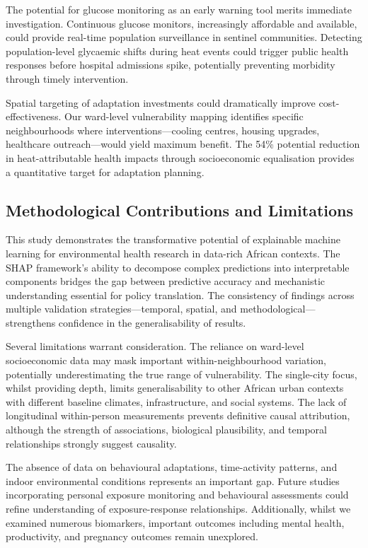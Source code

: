 \documentclass[11pt,a4paper]{article}
\begin{document}
The potential for glucose monitoring as an early warning tool merits immediate investigation. Continuous glucose monitors, increasingly affordable and available, could provide real-time population surveillance in sentinel communities. Detecting population-level glycaemic shifts during heat events could trigger public health responses before hospital admissions spike, potentially preventing morbidity through timely intervention.

Spatial targeting of adaptation investments could dramatically improve cost-effectiveness. Our ward-level vulnerability mapping identifies specific neighbourhoods where interventions—cooling centres, housing upgrades, healthcare outreach—would yield maximum benefit. The 54\% potential reduction in heat-attributable health impacts through socioeconomic equalisation provides a quantitative target for adaptation planning.

\subsection{Methodological Contributions and Limitations}

This study demonstrates the transformative potential of explainable machine learning for environmental health research in data-rich African contexts. The SHAP framework's ability to decompose complex predictions into interpretable components bridges the gap between predictive accuracy and mechanistic understanding essential for policy translation. The consistency of findings across multiple validation strategies—temporal, spatial, and methodological—strengthens confidence in the generalisability of results.

Several limitations warrant consideration. The reliance on ward-level socioeconomic data may mask important within-neighbourhood variation, potentially underestimating the true range of vulnerability. The single-city focus, whilst providing depth, limits generalisability to other African urban contexts with different baseline climates, infrastructure, and social systems. The lack of longitudinal within-person measurements prevents definitive causal attribution, although the strength of associations, biological plausibility, and temporal relationships strongly suggest causality.

The absence of data on behavioural adaptations, time-activity patterns, and indoor environmental conditions represents an important gap. Future studies incorporating personal exposure monitoring and behavioural assessments could refine understanding of exposure-response relationships. Additionally, whilst we examined numerous biomarkers, important outcomes including mental health, productivity, and pregnancy outcomes remain unexplored.
\end{document}
